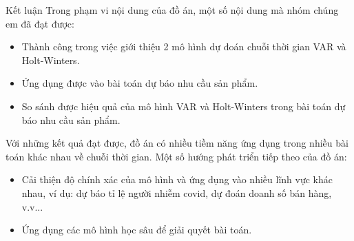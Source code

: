 \begin{frame}{Kết luận}
    Trong phạm vi nội dung của đồ án, một số nội dung mà nhóm chúng em đã đạt được:
\begin{itemize}
    \item Thành công trong việc giới thiệu 2 mô hình dự đoán chuỗi thời gian VAR và Holt-Winters. 
    \item Ứng dụng được vào bài toán dự báo nhu cầu sản phẩm.
    \item So sánh được hiệu quả của mô hình VAR và Holt-Winters trong bài toán dự báo nhu cầu sản phẩm.
\end{itemize}
Với những kết quả đạt được, đồ án có nhiều tiềm năng ứng dụng trong nhiều bài toán khác nhau về chuỗi thời gian. Một số hướng phát triển tiếp theo của đồ án:
\begin{itemize}
    \item Cải thiện độ chính xác của mô hình và ứng dụng vào nhiều lĩnh vực khác nhau, ví dụ: dự báo tỉ lệ người nhiễm covid, dự đoán doanh số bán hàng, v.v...
    \item Ứng dụng các mô hình học sâu để giải quyết bài toán.
\end{itemize}
\end{frame}
